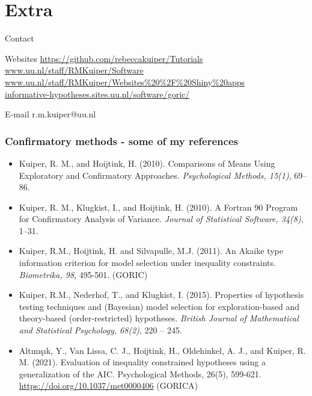\documentclass[10pt]{beamer}\usepackage[]{graphicx}\usepackage[]{xcolor}
\begin{document}
\section{Extra} 
%
%
\begin{frame}{Contact}

\begin{block}{Websites}
\url{https://github.com/rebeccakuiper/Tutorials}
\url{www.uu.nl/staff/RMKuiper/Software}\\
\url{www.uu.nl/staff/RMKuiper/Websites\%20\%2F\%20Shiny\%20apps}\\
\url{informative-hypotheses.sites.uu.nl/software/goric/}
\end{block}

\begin{block}{E-mail}
r.m.kuiper@uu.nl
\end{block}

\end{frame}
%
\begin{frame}
	\frametitle{Confirmatory methods - some of my references}
	
	\footnotesize{
		\begin{itemize}
			\item Kuiper, R. M., and Hoijtink, H. (2010). Comparisons of Means Using Exploratory and Confirmatory Approaches. \emph{Psychological Methods, 15(1)}, 69--86.\\
			\item Kuiper, R. M., Klugkist, I., and Hoijtink, H. (2010). A Fortran 90 Program for Confirmatory Analysis of Variance. \emph{Journal of Statistical Software, 34(8)}, 1--31.\\
			\item Kuiper, R.M., Hoijtink, H. and Silvapulle, M.J. (2011). An Akaike type information criterion for model selection under inequality constraints. \emph{Biometrika, 98}, 495-501. (GORIC)\\
			\item Kuiper, R.M., Nederhof, T., and Klugkist, I. (2015). Properties of hypothesis testing techniques and (Bayesian) model selection for exploration-based and theory-based (order-restricted) hypotheses. \emph{British Journal of Mathematical and Statistical Psychology, 68(2)}, 220 -- 245. \\
			\item 	Alt{\i}n{\i}\c{s}{\i}k, Y., Van Lissa, C. J., Hoijtink, H., Oldehinkel, A. J., and Kuiper, R. M. (2021). Evaluation of inequality constrained hypotheses using a generalization of the AIC. Psychological Methods, 26(5), 599-621. \url{https://doi.org/10.1037/met0000406} (GORICA)
		\end{itemize}
	}
\end{frame}
\end{document}
